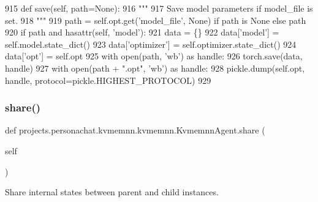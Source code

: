 \begin{DoxyCode}
915     \textcolor{keyword}{def }save(self, path=None):
916         \textcolor{stringliteral}{"""}
917 \textcolor{stringliteral}{        Save model parameters if model\_file is set.}
918 \textcolor{stringliteral}{        """}
919         path = self.opt.get(\textcolor{stringliteral}{'model\_file'}, \textcolor{keywordtype}{None}) \textcolor{keywordflow}{if} path \textcolor{keywordflow}{is} \textcolor{keywordtype}{None} \textcolor{keywordflow}{else} path
920         \textcolor{keywordflow}{if} path \textcolor{keywordflow}{and} hasattr(self, \textcolor{stringliteral}{'model'}):
921             data = \{\}
922             data[\textcolor{stringliteral}{'model'}] = self.model.state\_dict()
923             data[\textcolor{stringliteral}{'optimizer'}] = self.optimizer.state\_dict()
924             data[\textcolor{stringliteral}{'opt'}] = self.opt
925             with open(path, \textcolor{stringliteral}{'wb'}) \textcolor{keyword}{as} handle:
926                 torch.save(data, handle)
927             with open(path + \textcolor{stringliteral}{".opt"}, \textcolor{stringliteral}{'wb'}) \textcolor{keyword}{as} handle:
928                 pickle.dump(self.opt, handle, protocol=pickle.HIGHEST\_PROTOCOL)
929 
\end{DoxyCode}
\mbox{\label{classprojects_1_1personachat_1_1kvmemnn_1_1kvmemnn_1_1KvmemnnAgent_a713175baa1cbbcb147c34ec1bac8f77a}} 
\subsubsection{\texorpdfstring{share()}{share()}}
{\footnotesize\ttfamily def projects.\+personachat.\+kvmemnn.\+kvmemnn.\+Kvmemnn\+Agent.\+share (\begin{DoxyParamCaption}\item[{}]{self }\end{DoxyParamCaption})}

\begin{DoxyVerb}Share internal states between parent and child instances.
\end{DoxyVerb}
 

